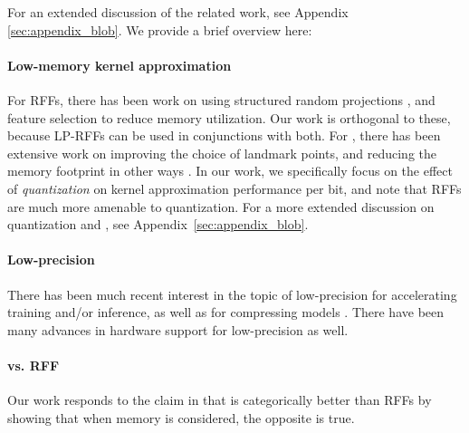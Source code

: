 For an extended discussion of the related work, see Appendix \ref{sec:appendix_blob}. We provide a brief overview here:
\paragraph{Low-memory kernel approximation} For RFFs, there has been work on using structured random projections \citep{fastfood,yu15,sphereRKS}, and feature selection \citep{sparseRKS, may2016} to reduce memory utilization. Our work is orthogonal to these, because LP-RFFs can be used in conjunctions with both. For \NystromNS, there has been extensive work on improving the choice of landmark points, and reducing the memory footprint in other ways \cite{ensemble09,fastpred14,meka14}. In our work, we specifically focus on the effect of \textit{quantization} on kernel approximation performance per bit, and note that RFFs are much more amenable to quantization. For a more extended discussion on quantization and \NystromNS, see Appendix~\ref{sec:appendix_blob}.
\paragraph{Low-precision} There has been much recent interest in the topic of low-precision for accelerating training and/or inference, as well as for compressing models \citep{gupta15,hogwild15,hubara16,halp18,desa17,han15}.  There have been many advances in hardware support for low-precision as well\citep{tpu17,brainwave17}.
\paragraph{\Nystrom vs. RFF} Our work responds to the claim in \citet{nysvsrff12} that \Nystrom is categorically better than RFFs by showing that when memory is considered, the opposite is true.


